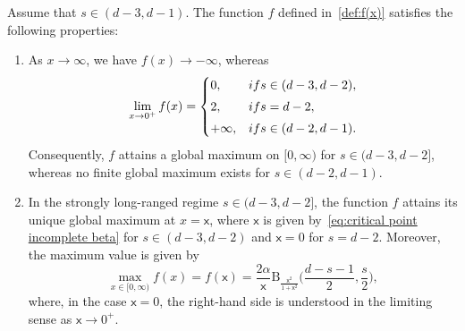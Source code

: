 \documentclass[10pt,a4paper]{amsart}
\begin{document}
\begin{lem} \label{lem: property f(x)}
Assume that $s\in(d-3,d-1)$. The function $f$ defined in~\eqref{def:f(x)} satisfies the following properties: 
\begin{enumerate}[label=\textup{(\roman*)}]
    \item \label{item: limits f(x)}
  As $x\to\infty$, we have $f(x)\to-\infty$, whereas 
    \begin{equation}
         \lim_{x\to 0^+}f(x)=  
        \begin{cases}
            0, &\textup{if } s \in (d-3,d-2),
            \smallskip 
            \\
            2, &\textup{if } s= d-2,
            \smallskip 
            \\
            +\infty, &\textup{if } s\in (d-2,d-1).
        \end{cases}
    \end{equation}
    Consequently, $f$ attains a global maximum on $[0,\infty)$ for $s\in(d-3,d-2]$, whereas no finite global maximum exists for $s\in(d-2,d-1)$. 
    \smallskip 
    \item \label{item: maximum existence}
    In the strongly long-ranged regime $s\in(d-3,d-2]$, the function $f$ attains its unique global maximum at $x=\mathsf{x}$, where $\mathsf{x}$ is given by~\eqref{eq:critical point incomplete beta} for $s\in (d-3,d-2)$ and $\mathsf{x}=0$ for $s=d-2$.
    Moreover, the maximum value is given by
    \begin{equation}
    \label{eq:f(x) maximum characterisation}
        \max_{x\in [0,\infty)} f(x) =f(\mathsf{x})= \frac{2\alpha}{\mathsf{x}} \mathrm{B}_{\frac{\mathsf{x}^2}{1+\mathsf{x}^2}}\Big(\frac{d-s-1}{2},\frac{s}{2}\Big),
    \end{equation}
   where, in the case $\mathsf{x}=0$, the right-hand side is understood in
the limiting sense as $\mathsf{x}\to0^+$. 
\end{enumerate}
\end{lem}
\end{document}
